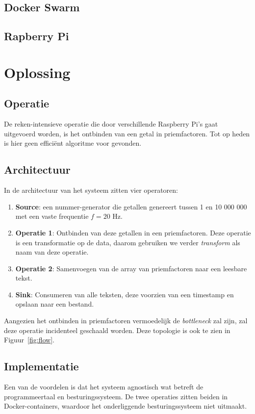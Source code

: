 \documentclass[twocolumn, a4paper]{article}
\begin{document}
\subsection{Docker Swarm}\label{ss:swarm}
\subsection{Rapberry Pi}\label{ss:rpi}

\section{Oplossing}

\subsection{Operatie}
De reken-intensieve operatie die door verschillende Raspberry Pi's gaat uitgevoerd worden, is het ontbinden van een getal in priemfactoren. Tot op heden is hier geen efficiënt algoritme voor gevonden.

\subsection{Architectuur}
In de architectuur van het systeem zitten vier operatoren:

\begin{enumerate}
    \item \textbf{Source}: een nummer-generator die getallen genereert tussen 1 en 10 000 000 met een vaste frequentie $f=20$ Hz.
    \item \textbf{Operatie 1}: Ontbinden van deze getallen in een priemfactoren. Deze operatie is een transformatie op de data, daarom gebruiken we verder \emph{transform} als naam van deze operatie.
    \item \textbf{Operatie 2}: Samenvoegen van de array van priemfactoren naar een leesbare tekst.
    \item \textbf{Sink}: Consumeren van alle teksten, deze voorzien van een timestamp en opslaan naar een bestand. 
\end{enumerate}

Aangezien het ontbinden in priemfactoren vermoedelijk  de \emph{bottleneck} zal zijn, zal deze operatie incidenteel geschaald worden. Deze topologie is ook te zien in Figuur~\ref{fig:flow}.

\subsection{Implementatie}
Een van de voordelen is dat het systeem agnostisch wat betreft de programmeertaal en besturingssysteem. De twee operaties zitten beiden in Docker-containers, waardoor het onderliggende besturingssysteem niet uitmaakt. 
\end{document}
